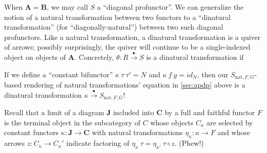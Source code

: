 \documentclass[letterpaper]{article}
\begin{document}
When $\mathbf{A} = \mathbf{B}$, we may call $S$ a ``diagonal profunctor''.
We can generalize the notion of a natural transformation between two
functors to a ``dinatural transformation'' (for ``diagonally-natural'')
between two such diagonal profunctors.  Like a natural transformation, a
dinatural transformation is a quiver of arrows; possibly surprisingly, the
quiver will continue to be a single-indexed object on objects of
$\mathbf{A}$.  Concretely, $\theta : R \stackrel{\bullet}{\to} S$ is a
dinatural transformation if
%
\begin{center}\end{center}

If we define a ``constant
bifunctor'' $\kappa~\tau~\tau' = N$ and $\kappa~f~g = id_N$, then our
$S_{\text{nat},F,G}$-based rendering of natural transformations' equation in
\autoref{sec:apdp} above is a
dinatural transformation $\kappa \stackrel{\bullet}{\to} S_{\text{nat},F,G}$!

Recall that a limit of a diagram $\mathbf{J}$ included into $\mathbf{C}$ by
a full and faithful functor $F$ is the terminal object in the subcategory of
$C$ whose objects $C_\kappa$ are selected by constant functors $\kappa :
\mathbf{J} \to \mathbf{C}$ with natural transformations $\eta_\kappa :
\kappa \stackrel{\cdot}{\to} F$ and whose arrows $z : C_\kappa \to
C_\kappa'$ indicate factoring of $\eta_\kappa~\tau = \eta_{\kappa'}~\tau
\circ z$.  (Phew!)
\end{document}
